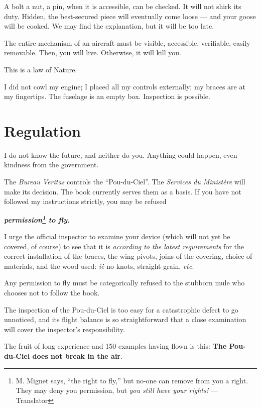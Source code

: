 \documentclass{book}
\begin{document}
A bolt a nut, a pin, when it is accessible, can be checked. It will
not shirk its duty. Hidden, the best-secured piece will eventually
come loose --- and your goose will be cooked.  We may find the
explanation, but it will be too late.

The entire mechanism of an aircraft must be visible, accessible,
verifiable, easily removable. Then, you will live. Otherwise, it will
kill you.

This is a law of Nature.

I did not cowl my engine; I placed all my controls externally; my
braces are at my fingertips. The fuselage is an empty box. Inspection
is possible.

\section{Regulation}

I do not know the future, and neither do you. Anything could happen,
even kindness from the government.

The \textit{Bureau Veritas} controls the ``Pou-du-Ciel''. The
\textit{Services du Minist\`ere} will make its decision. The book
currently serves them as a basis. If you have not followed my
instructions strictly, you may be refused

\begin{center}
  \textbf{ \large \emph{permission\footnote{M. Mignet says, ``the
        right to fly,'' but no-one can remove from you a right.  They
        may deny you permission, but \textit{you still have your
          rights!} --- Translator} to fly.}}
\end{center}

I urge the official inspector to examine your device (which will not
yet be covered, of course) to see that it is \emph{according to the
  latest requirements} for the correct installation of the braces, the
wing pivots, joins of the covering, choice of materials, and the wood
used: \textit{i\.e\.} no knots, straight grain, \textit{etc}.

Any permission to fly must be categorically refused to the stubborn
mule who chooses not to follow the book.

The inspection of the Pou-du-Ciel is too easy for a catastrophic
defect to go unnoticed, and its flight balance is so straightforward
that a close examination will cover the inspector's responsibility.

The fruit of long experience and 150 examples having flown is this:
\textbf{The Pou-du-Ciel does not break in the air}.
\end{document}
